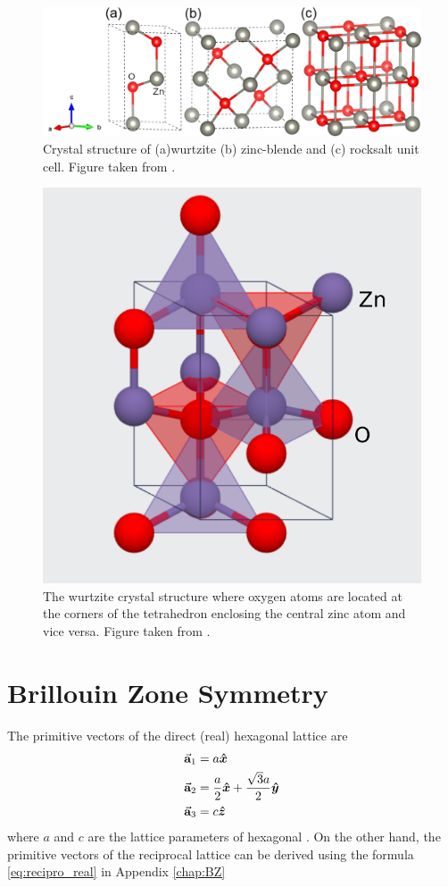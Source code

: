\begin{figure}[tbh!]
	\centering
	\includegraphics[width=0.7\linewidth]{"images/rrl/ZnO_unit"}
	\caption[Crystal structure of (a) wurtzite (b) zinc-blende and (c) rocksalt  unit cell]{Crystal structure of (a)wurtzite (b) zinc-blende and (c) rocksalt  unit cell. Figure taken from \citep{Ma2013}.}
	\label{fig:ZnO_unit}
\end{figure}

\begin{figure}[tbh!]
	\centering
	\includegraphics[width=0.3\linewidth]{"images/rrl/tetrahedral"}
	\caption[The wurtzite crystal structure where oxygen atoms are located at the corners of the  tetrahedron enclosing the central zinc atom and vice versa ]{The wurtzite crystal structure where oxygen atoms are located at the corners of the  tetrahedron enclosing the central zinc atom and vice versa. Figure taken from \citep{Jain2013}.}
	\label{fig:tetras}
\end{figure}

\section{Brillouin Zone Symmetry}
The primitive vectors of the direct (real) hexagonal lattice are
\begin{align}
	\va{a}_1 & = a \vu*{x}                                         \\
	\va{a}_2 & = \frac{a}{2} \vu*{x} + \frac{\sqrt{3}a}{2} \vu*{y} \\
	\va{a}_3 & = c \vu*{z}
\end{align}
where $a$ and $c$ are the lattice parameters of hexagonal . On the other hand, the primitive vectors of the reciprocal lattice can be derived using the formula \eqref{eq:recipro_real} in Appendix \ref{chap:BZ}

